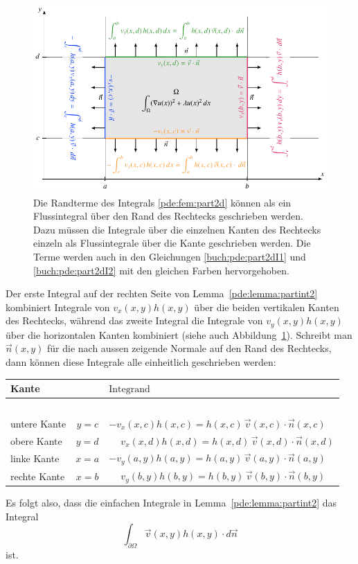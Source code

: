 \begin{figure}
\centering
\includegraphics{chapters/70-pde/images/2dpart.pdf}
\caption{Die Randterme des Integrals \eqref{pde:fem:part2d}  können
als ein Flussintegral über den Rand des Rechtecks geschrieben werden.
Dazu müssen die Integrale über die einzelnen Kanten des Rechtecks einzeln
als Flussintegrale über die Kante geschrieben werden.
Die Terme werden auch in den Gleichungen
\eqref{buch:pde:part2dI1} und \eqref{buch:pde:part2dI2}
mit den gleichen Farben hervorgehoben.
\label{buch:pde:pfadintegral}}
\end{figure}
Der erste Integral auf der rechten Seite von Lemma~\ref{pde:lemma:partint2}
kombiniert Integrale von $v_x(x,y) h(x,y)$ über die beiden vertikalen Kanten 
des Rechtecks, während das zweite Integral die Integrale von
$v_y(x,y)h(x,y)$ über die horizontalen Kanten kombiniert (siehe auch
Abbildung~\ref{buch:pde:pfadintegral}).
Schreibt man $\vec{n}(x,y)$ für die nach aussen zeigende Normale auf den Rand 
des Rechtecks, dann können diese Integrale alle einheitlich geschrieben
werden:
\begin{center}
\begin{tabular}{l >{$}c<{$} >{$}l<{$}}
Kante& &\text{Integrand}
\\[2pt]
\hline
\\[-7pt]
\color{orange}untere Kante
	&y=c
	&         - v_x(x,c)h(x,c) = h(x,c) \, \vec{v}(x,c) \cdot \vec{n}(x,c)
\\[4pt]
\color{gruen}obere Kante
	&y=d
	&\phantom{-}v_x(x,d)h(x,d) = h(x,d) \, \vec{v}(x,d) \cdot \vec{n}(x,d)
\\[4pt]
\color{azure}linke Kante
	&x=a
	&         - v_y(a,y)h(a,y) = h(a,y) \, \vec{v}(a,y) \cdot \vec{n}(a,y)
\\[4pt]
\color{magenta}rechte Kante
	&x=b
 	&\phantom{-}v_y(b,y)h(b,y) = h(b,y) \, \vec{v}(b,y) \cdot \vec{n}(b,y)
\\[4pt]
\hline
\end{tabular}
\end{center}
Es folgt also, dass die einfachen Integrale in 
Lemma~\ref{pde:lemma:partint2} das Integral
\[
\int_{\partial\Omega} \vec{v}(x,y) h(x,y) \cdot d\vec{n}
\]
ist.


